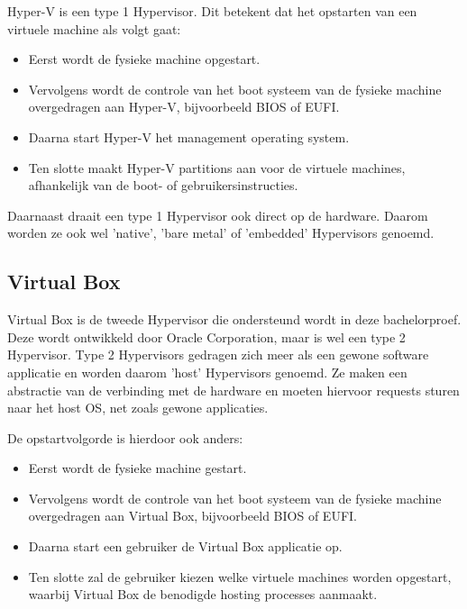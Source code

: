 Hyper-V is een type 1 Hypervisor. Dit betekent dat het opstarten van een virtuele machine als volgt gaat:
\begin{itemize}[noitemsep]
	\item Eerst wordt de fysieke machine opgestart.
	\item Vervolgens wordt de controle van het boot systeem van de fysieke machine overgedragen aan Hyper-V, bijvoorbeeld BIOS of EUFI.
	\item Daarna start Hyper-V het management operating system.
	\item Ten slotte maakt Hyper-V partitions aan voor de virtuele machines, afhankelijk van de boot- of gebruikersinstructies.
\end{itemize}
Daarnaast draait een type 1 Hypervisor ook direct op de hardware. Daarom worden ze ook wel 'native', 'bare metal' of 'embedded' Hypervisors genoemd.

\subsection{Virtual Box}
Virtual Box is de tweede Hypervisor die ondersteund wordt in deze bachelorproef. Deze wordt ontwikkeld door Oracle Corporation, maar is wel een type 2 Hypervisor. Type 2 Hypervisors gedragen zich meer als een gewone software applicatie en worden daarom 'host' Hypervisors genoemd. Ze maken een abstractie van de verbinding met de hardware en moeten hiervoor requests sturen naar het host OS, net zoals gewone applicaties.

De opstartvolgorde is hierdoor ook anders:
\begin{itemize}[noitemsep]
	\item Eerst wordt de fysieke machine gestart.
	\item Vervolgens wordt de controle van het boot systeem van de fysieke machine overgedragen aan Virtual Box, bijvoorbeeld BIOS of EUFI.
	\item Daarna start een gebruiker de Virtual Box applicatie op.
	\item Ten slotte zal de gebruiker kiezen welke virtuele machines worden opgestart, waarbij Virtual Box de benodigde hosting processes aanmaakt.
\end{itemize}

